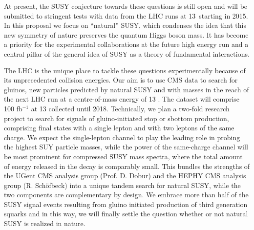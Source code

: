 \documentclass[11pt,a4paper]{article}
\begin{document}
At present, the SUSY conjecture towards these questions is still open and will be submitted to stringent tests with data from the LHC runs at 13~\TeV starting in 2015.
In this proposal we focus on ``natural'' SUSY, which condenses the idea that this new symmetry of nature preserves the quantum Higgs boson mass.
It has become a priority for the experimental collaborations at the future high energy run and a central pillar of the general idea of SUSY as a theory of fundamental interactions. 

The LHC is the unique place to tackle these questions experimentally because of its unprecedented collision energies.
Our aim is to use CMS data to search for gluinos, new particles predicted by natural SUSY and with masses in the reach of the next LHC run at a centre-of-mass energy of 13 \TeV.
The dataset will comprise 100 fb${}^{-1}$ at 13 \TeV collected until 2018. 
Technically, we plan a two-fold research project to search for signals of gluino-initiated stop or sbottom production, comprising final states with a single lepton and with two leptons of the same charge.
We expect the single-lepton channel to play the leading role in probing the highest SUY particle masses, while the power of the same-charge channel will be most prominent for compressed SUSY mass spectra,
where the total amount of energy released in the decay is comparably small.
This bundles the strengths of the UGent CMS analysis group (Prof. D. Dobur) and the HEPHY CMS analysis group (R. Sch\"ofbeck) into a unique tandem search for natural SUSY, while
the two components are complementary by design. We embrace more than half of the SUSY signal events resulting from gluino initiated production of third generation squarks and 
in this way, we will finally settle the question whether or not natural SUSY is realized in nature. 
\end{document}

